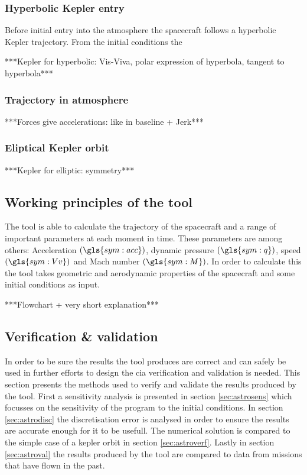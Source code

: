\subsubsection{Hyperbolic Kepler entry}
 \label{sec:hypkep}
Before initial entry into the atmosphere the spacecraft follows a hyperbolic Kepler trajectory. From the initial conditions the 

***Kepler for hyperbolic: Vis-Viva, polar expression of hyperbola, tangent to hyperbola***\\

\subsubsection{Trajectory in atmosphere}
 \label{sec:trajatmos}
***Forces give accelerations: like in baseline + Jerk***\\

\subsubsection{Eliptical Kepler orbit}
 \label{sec:eliptickep}
***Kepler for elliptic: symmetry***\\

\subsection{Working principles of the tool}
\label{sec:astrowp}
The tool is able to calculate the trajectory of the spacecraft and a range of important parameters at each moment in time. These parameters are among others: Acceleration $\left(\gls{sym:acc}\right)$, dynamic pressure $\left(\gls{sym:q}\right)$, speed $\left(\gls{sym:Vv}\right)$ and Mach number $\left(\gls{sym:M}\right)$. In order to calculate this the tool takes geometric and aerodynamic properties of the spacecraft and some initial conditions as input.

***Flowchart + very short explanation***\\

\subsection{Verification \& validation}
\label{sec:astrovv}
In order to be sure the results the tool produces are correct and can safely be used in further efforts to design the \gls{cia} verification and validation is needed. This section presents the methods used to verify and validate the results produced by the tool. First a sensitivity analysis is presented in section \ref{sec:astrosens} which focusses on the sensitivity of the program to the initial conditions. In section \ref{sec:astrodisc} the discretisation error is analysed in order to ensure the results are accurate enough for it to be usefull. The numerical solution is compared to the simple case of a kepler orbit in section \ref{sec:astroverf}. Lastly in section \ref{sec:astroval} the results produced by the tool are compared to data from missions that have flown in the past.

